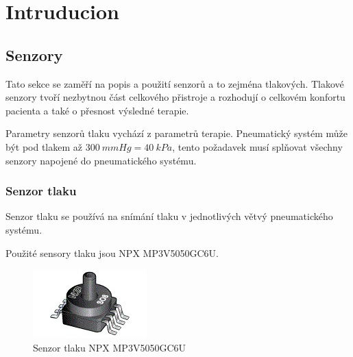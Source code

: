 \documentclass{ctuthesis}
\begin{document}
\maketitle



\chapter{Intruducion}





\section{Senzory}
Tato sekce se zaměří na popis a použití senzorů a to zejména tlakových. Tlakové senzory tvoří nezbytnou část celkového přistroje a rozhodují o celkovém konfortu pacienta a také o přesnost výsledné terapie. \par
Parametry senzorů tlaku vychází z parametrů terapie. Pneumatický systém může být pod tlakem až $300 \ mmHg = 40 \ kPa$, tento požadavek musí splňovat všechny senzory napojené do pneumatického systému.

\subsection{Senzor tlaku}
Senzor tlaku se používá na snímání tlaku v jednotlivých větvý pneumatického systému. \par


Použité sensory tlaku jsou NPX MP3V5050GC6U. 

\begin{figure}[H]
    \centering
    \includegraphics{pictures/nxp_sensor.jpg}
    \caption{Senzor tlaku NPX MP3V5050GC6U}
    \label{fig:nxp}
\end{figure}
\end{document}
